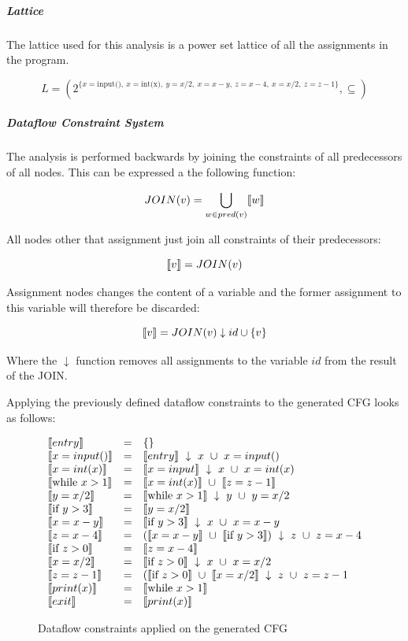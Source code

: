 \subparagraph{Lattice}
The lattice used for this analysis is a power set lattice of all the assignments in the program.

\[ L = ( 2^{ \{x = \text{input()}, ~ x = \text{int(x)}, ~ y = x/2, ~ x = x-y, ~ z = x-4, ~ x = x/2, ~ z = z-1 \} } , \subseteq ) \]


\subparagraph{Dataflow Constraint System}
The analysis is performed backwards by joining the constraints of all predecessors of all nodes.
This can be expressed a the following function:

\[ JOIN(v) = \bigcup_{ w \in pred(v)} \llbracket w \rrbracket \]

All nodes other that assignment just join all constraints of their predecessors:

\[ \llbracket v \rrbracket = JOIN(v) \]

Assignment nodes changes the content of a variable and the former assignment to this variable will therefore be discarded:

\[ \llbracket v \rrbracket = JOIN(v) \downarrow id \cup \{ v \} \]

Where the $\downarrow$ function removes all assignments to the variable $id$ from the result of the JOIN.

Applying the previously defined dataflow constraints to the generated CFG looks as follows:

\begin{figure}[H]
\[
\begin{array}{lcl}
  \llbracket entry \rrbracket & = & \{\}\\
  \llbracket x = input() \rrbracket & = & \llbracket entry \rrbracket ~ \downarrow ~ x ~ \cup ~ x = input()\\
  \llbracket x = int(x) \rrbracket & = & \llbracket x = input \rrbracket ~ \downarrow ~ x ~ \cup ~ x = int(x)\\
  \llbracket \text{while } x > 1 \rrbracket & = & \llbracket x = int(x) \rrbracket ~ \cup ~ \llbracket z = z - 1 \rrbracket\\
  \llbracket  y = x / 2 \rrbracket & = & \llbracket \text{while } x > 1 \rrbracket ~ \downarrow ~ y ~ \cup ~ y = x / 2\\
  \llbracket \text{if } y > 3 \rrbracket & = & \llbracket  y = x / 2 \rrbracket\\
  \llbracket  x = x-y \rrbracket & = & \llbracket \text{if } y > 3 \rrbracket ~ \downarrow ~ x ~ \cup ~ x = x-y\\
  \llbracket  z = x-4 \rrbracket & = & (\llbracket x = x-y \rrbracket ~ \cup ~ \llbracket \text{if } y > 3 \rrbracket) ~ \downarrow ~ z ~ \cup ~ z = x-4\\
  \llbracket \text{if } z > 0 \rrbracket & = & \llbracket z = x - 4 \rrbracket\\
  \llbracket x = x / 2 \rrbracket & = & \llbracket \text{if } z > 0 \rrbracket ~ \downarrow ~ x ~ \cup ~ x = x/2\\
  \llbracket z = z - 1 \rrbracket & = & (\llbracket \text{if } z > 0 \rrbracket ~ \cup ~ \llbracket x = x / 2 \rrbracket ~ \downarrow ~ z ~ \cup ~ z = z - 1\\
  \llbracket print(x) \rrbracket & = & \llbracket \text{while } x > 1 \rrbracket\\
  \llbracket exit \rrbracket & = & \llbracket print(x) \rrbracket
\end{array}
\]
\caption{Dataflow constraints applied on the generated CFG}
\end{figure}

